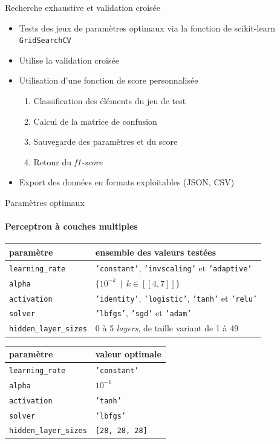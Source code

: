 \documentclass[usenames,dvipsnames]{beamer}
\begin{document}
\begin{frame}{Recherche exhaustive et validation croisée}
\begin{itemize}
\item Tests des jeux de paramètres optimaux via la fonction de scikit-learn \texttt{GridSearchCV}
\item Utilise la validation croisée
\item Utilisation d'une fonction de score personnalisée \begin{enumerate}
\item Classification des éléments du jeu de test
\item Calcul de la matrice de confusion
\item Sauvegarde des paramètres et du score
\item Retour du \emph{f1-score}
\end{enumerate}
\item Export des données en formats exploitables (JSON, CSV)
\end{itemize}
\end{frame}

\begin{frame}{Paramètres optimaux}
\framesubtitle{Perceptron à couches multiples}

\begin{table}
\tiny
\centering
\begin{tabular}{l l}
paramètre & ensemble des valeurs testées \\
\hline
\texttt{learning\_rate} & \texttt{'constant'}, \texttt{'invscaling'} et \texttt{'adaptive'}\\
\texttt{alpha} & $\{10^{-k} \>\> | \>\> k \in [\![4, 7]\!] \}$ \\
\texttt{activation} & \texttt{'identity'}, \texttt{'logistic'}, \texttt{'tanh'} et \texttt{'relu'}\\
\texttt{solver} &\texttt{'lbfgs'}, \texttt{'sgd'} et \texttt{'adam'} \\
\texttt{hidden\_layer\_sizes} & 0 à 5 \emph{layers}, de taille variant de 1 à 49 \\
\end{tabular}
\end{table}

\begin{table}
\centering
\begin{tabular}{l l}
paramètre & valeur optimale \\
\hline
\texttt{learning\_rate} & \texttt{'constant'}\\
\texttt{alpha} & $10^{-6}$ \\
\texttt{activation} & \texttt{'tanh'}\\
\texttt{solver} & \texttt{'lbfgs'}\\
\texttt{hidden\_layer\_sizes} & \texttt{[28, 28, 28]}\\
\end{tabular}
\end{table}

\end{frame}
\end{document}
